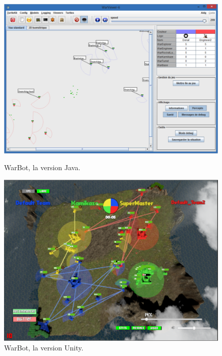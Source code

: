 \documentclass{report}
\begin{document}
\paragraph{}
\begin{figure}[h]
    \begin{minipage}[c]{.46\linewidth}
        \centering
        \includegraphics[scale=0.45]{interface-warbot3}
        \caption{WarBot, la version Java.}
    \end{minipage}
    \hfill%
    \begin{minipage}[c]{.46\linewidth}
        \centering
        \includegraphics[scale=0.3]{WarbotUnity}
        \caption{WarBot, la version Unity.}
    \end{minipage}
\end{figure}
\end{document}

